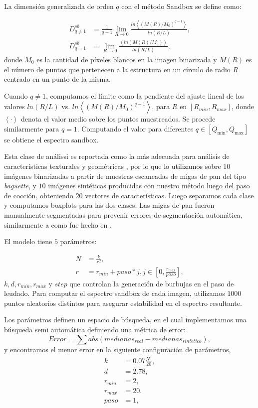 La dimensión generalizada de orden $q$ con el método Sandbox se define como:

 \begin{align*}
D_{q\ne 1}^{sb} &= \frac{1}{q-1} \lim_{R \rightarrow 0}{
\frac{ln   { \left\langle  (M(R)/M_{0})^{q-1} \right\rangle   }}
{ln {(R/L)}       }},\\
D_{q=1}^{sb} &= \lim_{R \rightarrow 0}{
\frac{ \left\langle ln   { (M(R)/M_{0})  }  \right\rangle}
{ln {(R/L)}       }},
\end{align*}
%
donde $M_{0}$ es la cantidad de píxeles blancos en la imagen binarizada y $M(R)$ es el número de puntos que pertenecen a la estructura en un círculo de radio $R$ centrado en un punto de la misma.

Cuando $q\ne1$, computamos el límite como la pendiente del ajuste lineal de los valores $ln(R/L)$ vs. $ ln  \left\langle  { (M(R)/M_{0})^{q-1} }  \right\rangle$, para $R$ en $[R_{min}, R_{max}]$, donde $ \left\langle \cdot  \right\rangle$ denota el valor medio sobre los puntos muestreados.
Se procede similarmente para $q=1$. 
Computando el valor para diferentes $q \in [Q_{\min},Q_{\max}]$  se obtiene el espectro sandbox.

Esta clase de análissi es reportada como la más adecuada para análisis de características texturales y geométricas \cite{Gonzales2008}, por lo que lo utilizamos sobre $10$ imágenes binarizadas a partir de muestras escaneadas de migas de pan del tipo {\em baguette}, y $10$ imágenes sintéticas producidas con nuestro método luego del paso de cocción, obteniendo $20$ vectores de características.
Luego separamos cada clase y computamos boxplots para las dos clases.
Las migas de pan fueron manualmente segmentadas para prevenir errores de segmentación automática, similarmente a como fue hecho en \cite{Bosch2011}.

El modelo tiene $5$ parámetros:

\begin{align*}
N &= \frac{k}{r^{d}},\\ r &= r_{min}+paso*j, j \in [0,\frac{r_{max}}{paso}],
\end{align*}
$k,d,r_{min},r_{max}$ y $step$ que controlan la generación de burbujas en el paso de leudado.
Para computar el espectro sandbox de cada imagen, utilizamos $1000$ puntos aleatorios distintos para asegurar estabilidad en el espectro resultante.

Los parámetros definen un espacio de búsqueda, en el cual implementamos una búsqueda semi automática definiendo una métrica de error:
\begin{equation*}
Error = \displaystyle \sum abs(medianas_{real}-medianas_{sint\acute{e}tico}),
\end{equation*}
y encontramos el menor error en la siguiente configuración de parámetros,
\begin{align*}
k &= 0.07 \frac{N^{3}}{20} ,\\
d &=2.78,\\
r_{min} &=2,\\
r_{max} &=20.\\
paso &=1,
\end{align*}

